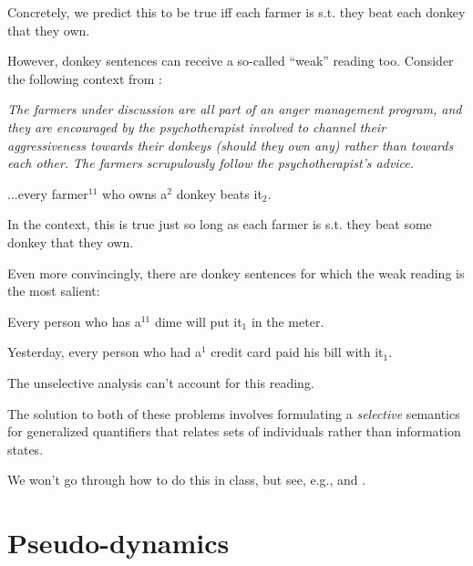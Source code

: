 \documentclass[nols,twoside,nofonts,nobib,nohyper]{tufte-handout}
\theoremstyle{observation}
\theoremstyle{theorem}
\theoremstyle{corollary}
\theoremstyle{definition}
\begin{document}
Concretely, we predict this to be true iff each farmer is s.t. they beat each donkey that they own.

However, donkey sentences can receive a so-called \enquote{weak} reading too. Consider the following context from \cite{Chierchia1995}:

\textit{The farmers under discussion are all part of an anger management program, and they are encouraged by the psychotherapist involved to channel their aggressiveness towards their donkeys (should they own any) rather than towards each other. The farmers scrupulously follow the psychotherapist's advice.}

\ex
...every farmer$^{11}$ who owns a$^{2}$ donkey beats it$_{2}$.
\xe

In the context, this is true just so long as each farmer is s.t. they beat some donkey that they own.

Even more convincingly, there are donkey sentences for which the weak reading is the most salient:

\ex
Every person who has a$^{11}$ dime will put it$_{1}$ in the meter.
\xe

\ex
Yesterday, every person who had a$^{1}$ credit card paid his bill with it$_{1}$.
\xe

The unselective analysis can't account for this reading.

The solution to both of these problems involves formulating a \textit{selective} semantics for generalized quantifiers that relates sets of individuals rather than information states.

We won't go through how to do this in class, but see, e.g., \cite{Chierchia1995} and \cite{Kanazawa1994}.

\section{Pseudo-dynamics}
\end{document}

